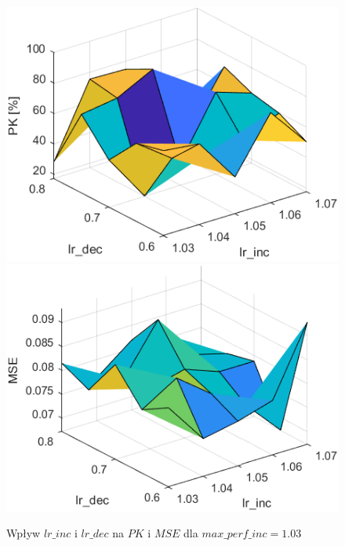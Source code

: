 \begin{figure}[!htb]
  \includegraphics[width = \linewidth]{Grafika/exp5/pk103.png}
\endminipage\hfill
{}
  \includegraphics[width = \linewidth]{Grafika/exp5/mse103.png}
\endminipage\hfill
\caption{Wpływ $lr\_inc$ i $lr\_dec$ na $PK$ i $MSE$ dla $max\_perf\_inc=1.03$}
\end{figure}

